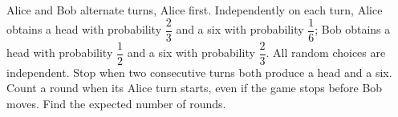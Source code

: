 Alice and Bob alternate turns, Alice first. Independently on each turn, Alice obtains a head with probability $\dfrac{2}{3}$ and a six with probability $\dfrac{1}{6}$; Bob obtains a head with probability $\dfrac{1}{2}$ and a six with probability $\dfrac{2}{3}$. All random choices are independent. Stop when two consecutive turns both produce a head and a six. Count a round when its Alice turn starts, even if the game stops before Bob moves. Find the expected number of rounds.
